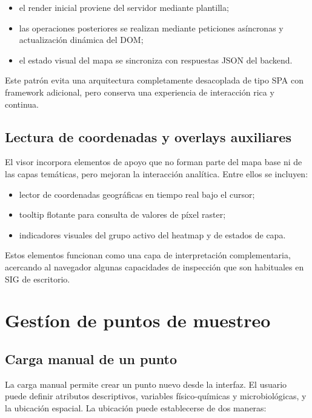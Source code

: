 \documentclass[12pt,a4paper]{report}
\begin{document}
\begin{itemize}
    \item el render inicial proviene del servidor mediante plantilla;
    \item las operaciones posteriores se realizan mediante peticiones as\'incronas y actualizaci\'on din\'amica del DOM;
    \item el estado visual del mapa se sincroniza con respuestas JSON del backend.
\end{itemize}

Este patr\'on evita una arquitectura completamente desacoplada de tipo SPA con framework adicional, pero conserva una experiencia de interacci\'on rica y continua.

\subsection{Lectura de coordenadas y overlays auxiliares}

El visor incorpora elementos de apoyo que no forman parte del mapa base ni de las capas tem\'aticas, pero mejoran la interacci\'on anal\'itica. Entre ellos se incluyen:

\begin{itemize}
    \item lector de coordenadas geogr\'aficas en tiempo real bajo el cursor;
    \item tooltip flotante para consulta de valores de p\'ixel raster;
    \item indicadores visuales del grupo activo del heatmap y de estados de capa.
\end{itemize}

Estos elementos funcionan como una capa de interpretaci\'on complementaria, acercando al navegador algunas capacidades de inspecci\'on que son habituales en SIG de escritorio.

\section{Gest\'ion de puntos de muestreo}

\subsection{Carga manual de un punto}

La carga manual permite crear un punto nuevo desde la interfaz. El usuario puede definir atributos descriptivos, variables f\'isico-qu\'imicas y microbiol\'ogicas, y la ubicaci\'on espacial. La ubicaci\'on puede establecerse de dos maneras:
\end{document}
